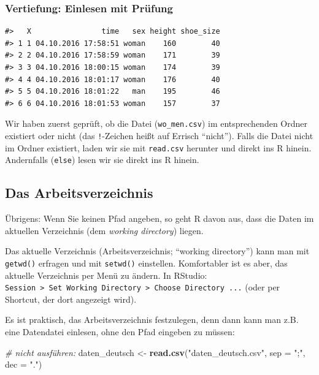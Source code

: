 \documentclass[12pt,ngerman,]{book}
\makeatletter
\newenvironment{Shaded}{\begin{snugshade}}{\end{snugshade}}
\newcommand{\KeywordTok}[1]{\textcolor[rgb]{0.13,0.29,0.53}{\textbf{{#1}}}}
\newcommand{\DataTypeTok}[1]{\textcolor[rgb]{0.13,0.29,0.53}{{#1}}}
\newcommand{\StringTok}[1]{\textcolor[rgb]{0.31,0.60,0.02}{{#1}}}
\newcommand{\CommentTok}[1]{\textcolor[rgb]{0.56,0.35,0.01}{\textit{{#1}}}}
\newcommand{\NormalTok}[1]{{#1}}
\newenvironment{kframe}{%
\medskip{}
\setlength{\fboxsep}{.8em}
 \def\at@end@of@kframe{}%
 \ifinner\ifhmode%
  \def\at@end@of@kframe{\end{minipage}}%
  \begin{minipage}{\columnwidth}%
 \fi\fi%
 \def\FrameCommand##1{\hskip\@totalleftmargin \hskip-\fboxsep
 \colorbox{shadecolor}{##1}\hskip-\fboxsep
     \hskip-\linewidth \hskip-\@totalleftmargin \hskip\columnwidth}%
 \MakeFramed {\advance\hsize-\width
   \@totalleftmargin\z@ \linewidth\hsize
   \@setminipage}}%
 {\par\unskip\endMakeFramed%
 \at@end@of@kframe}
\renewenvironment{Shaded}{\begin{kframe}}{\end{kframe}}
\let\BeginKnitrBlock\begin \let\EndKnitrBlock\end
\makeatother
\begin{document}
\subsubsection{Vertiefung: Einlesen mit
Prüfung}\label{vertiefung-einlesen-mit-prufung}

\begin{verbatim}
#>   X                time   sex height shoe_size
#> 1 1 04.10.2016 17:58:51 woman    160        40
#> 2 2 04.10.2016 17:58:59 woman    171        39
#> 3 3 04.10.2016 18:00:15 woman    174        39
#> 4 4 04.10.2016 18:01:17 woman    176        40
#> 5 5 04.10.2016 18:01:22   man    195        46
#> 6 6 04.10.2016 18:01:53 woman    157        37
\end{verbatim}

Wir haben zuerst geprüft, ob die Datei (\texttt{wo\_men.csv}) im
entsprechenden Ordner existiert oder nicht (das \texttt{!}-Zeichen heißt
auf Errisch ``nicht''). Falls die Datei nicht im Ordner existiert, laden
wir sie mit \texttt{read.csv} herunter und direkt ins R hinein.
Andernfalls (\texttt{else}) lesen wir sie direkt ins R hinein.

\subsection{Das Arbeitsverzeichnis}\label{das-arbeitsverzeichnis}

\BeginKnitrBlock{rmdcaution}
Übrigens: Wenn Sie keinen Pfad angeben, so geht R davon aus, dass die
Daten im aktuellen Verzeichnis (dem \emph{working directory}) liegen.
\EndKnitrBlock{rmdcaution}

Das aktuelle Verzeichnis (Arbeitsverzeichnis; ``working directory'')
kann man mit \texttt{getwd()} erfragen und mit \texttt{setwd()}
einstellen. Komfortabler ist es aber, das aktuelle Verzeichnis per Menü
zu ändern. In RStudio:
\texttt{Session\ \textgreater{}\ Set\ Working\ Directory\ \textgreater{}\ Choose\ Directory\ ...}
(oder per Shortcut, der dort angezeigt wird).

Es ist praktisch, das Arbeitsverzeichnis festzulegen, denn dann kann man
z.B. eine Datendatei einlesen, ohne den Pfad eingeben zu müssen:

\begin{Shaded}
\begin{Highlighting}[]
\CommentTok{# nicht ausführen:}
\NormalTok{daten_deutsch <-}\StringTok{ }\KeywordTok{read.csv}\NormalTok{(}\StringTok{"daten_deutsch.csv"}\NormalTok{, }\DataTypeTok{sep =} \StringTok{";"}\NormalTok{, }\DataTypeTok{dec =} \StringTok{"."}\NormalTok{)}
\end{Highlighting}
\end{Shaded}
\end{document}
